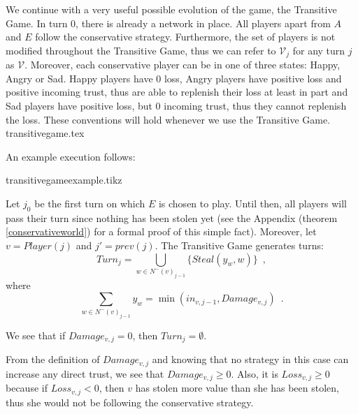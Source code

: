      We continue with a very useful possible evolution of the game, the Transitive Game. In turn 0, there is already a network
     in place. All players apart from $A$ and $E$ follow the conservative strategy. Furthermore, the set of players is not
     modified throughout the Transitive Game, thus we can refer to $\mathcal{V}_j$ for any turn $j$ as $\mathcal{V}$.
     Moreover, each conservative player can be in one of three states: Happy, Angry or Sad. Happy players have 0 loss, Angry
     players have positive loss and positive incoming trust, thus are able to replenish their loss at least in part and
     Sad players have positive loss, but 0 incoming trust, thus they cannot replenish the loss. These conventions will hold
     whenever we use the Transitive Game.
     {transitivegame.tex}

     An example execution follows:

     {transitivegameexample.tikz}

     Let $j_0$ be the first turn on which $E$ is chosen to play. Until then, all players will pass their turn since nothing
     has been stolen yet (see the Appendix (theorem \ref{conservativeworld}) for a formal proof of this simple fact).
     Moreover, let $v = Player(j)$ and $j' = prev\left(j\right)$.
     The Transitive Game generates turns:
     \begin{equation}
        Turn_j = \bigcup\limits_{w \in N^{-}\left(v\right)_{j-1}}\{Steal\left(y_w,w\right)\} \enspace,
     \end{equation}
     where
     \begin{equation*}
        \sum\limits_{w \in N^{-}\left(v\right)_{j-1}}y_w = \min\left(in_{v, j-1}, Damage_{v, j}\right) \enspace.
     \end{equation*}
 
     We see that if $Damage_{v, j} = 0$, then $Turn_j = \emptyset$.

     From the definition of $Damage_{v,j}$ and knowing that no strategy in this case can increase any direct trust, we see
     that $Damage_{v,j} \geq 0$. Also, it is $Loss_{v,j} \geq 0$ because if $Loss_{v,j} < 0$, then $v$ has
     stolen more value than she has been stolen, thus she would not be following the conservative strategy.
